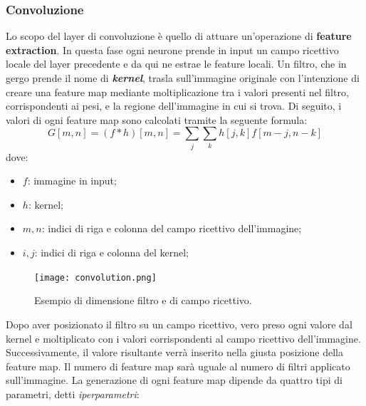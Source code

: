 \subsubsection{Convoluzione}
Lo scopo del layer di convoluzione è quello di attuare un'operazione di {\bfseries{feature 
extraction}}. In questa fase ogni neurone prende in input un campo ricettivo 
locale del layer precedente e da qui ne estrae le feature locali. Un filtro, che in 
gergo prende il nome di {\bfseries{\emph{kernel}}}, trasla sull'immagine originale con l'intenzione di 
creare una feature map mediante moltiplicazione tra i valori presenti nel filtro, 
corrispondenti ai pesi, e la regione dell'immagine in cui si trova. Di seguito, i 
valori di ogni feature map sono calcolati tramite la seguente formula:
\begin{equation}\label{sum convolution}
    G[m,n] = (f*h)[m,n] = \sum_j\sum_kh[j,k]f[m-j,n-k]
\end{equation}
dove:
\begin{itemize}
    \item $f$: immagine in input;
    \item $h$: kernel;
    \item $m,n$: indici di riga e colonna del campo ricettivo dell'immagine;
    \item $i,j$: indici di riga e colonna del kernel;
\end{itemize}
\begin{figure}
    \centering
    \texttt{[image: convolution.png]}
    \centering
    \caption{Esempio di dimensione filtro e di campo ricettivo.}
    \label{filter dimension}
\end{figure}
Dopo aver posizionato il filtro su un campo ricettivo, vero preso ogni valore dal 
kernel e moltiplicato con i valori corrispondenti al campo ricettivo dell'immagine. 
Successivamente, il valore risultante verrà inserito nella giusta posizione della 
feature map. Il numero di feature map sarà uguale al numero di filtri applicato 
sull'immagine. La generazione di ogni feature map dipende da quattro tipi di 
parametri, detti 
\emph{iperparametri}:
